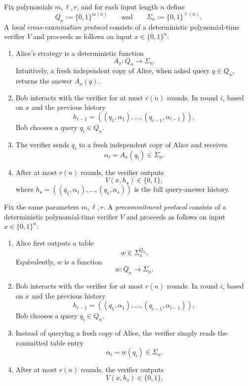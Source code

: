\documentclass[11pt]{article}
\begin{document}
\begin{definition}
Fix polynomials \(m,\ell,r\), and for each input length \(n\) define
\[
Q_n := \{0,1\}^{m(n)}
\qquad\text{and}\qquad
\Sigma_n := \{0,1\}^{\ell(n)}.
\]
A \emph{local cross-examination protocol} consists of a deterministic polynomial-time
verifier \(V\) and proceeds as follows on input \(x\in\{0,1\}^n\):

\begin{enumerate}
    \item Alice's strategy is a deterministic function
    \[
    A_x : Q_n \to \Sigma_n.
    \]
    Intuitively, a fresh independent copy of Alice, when asked query \(q\in Q_n\),
    returns the answer \(A_x(q)\).

    \item Bob interacts with the verifier for at most \(r(n)\) rounds.
    In round \(i\), based on \(x\) and the previous history
    \[
    h_{i-1} = ((q_1,\alpha_1),\dots,(q_{i-1},\alpha_{i-1})),
    \]
    Bob chooses a query \(q_i \in Q_n\).

    \item The verifier sends \(q_i\) to a fresh independent copy of Alice and receives
    \[
    \alpha_i = A_x(q_i)\in\Sigma_n.
    \]

    \item After at most \(r(n)\) rounds, the verifier outputs
    \[
    V(x,h_s)\in\{0,1\},
    \]
    where \(h_s=((q_1,\alpha_1),\dots,(q_s,\alpha_s))\) is the full query-answer history.
\end{enumerate}
\end{definition}

\begin{definition}
Fix the same parameters \(m,\ell,r\).
A \emph{precommitment protocol} consists of a deterministic polynomial-time verifier
\(V\) and proceeds as follows on input \(x\in\{0,1\}^n\):

\begin{enumerate}
    \item Alice first outputs a table
    \[
    w \in \Sigma_n^{Q_n}.
    \]
    Equivalently, \(w\) is a function
    \[
    w : Q_n \to \Sigma_n.
    \]

    \item Bob interacts with the verifier for at most \(r(n)\) rounds.
    In round \(i\), based on \(x\) and the previous history
    \[
    h_{i-1} = ((q_1,\alpha_1),\dots,(q_{i-1},\alpha_{i-1})),
    \]
    Bob chooses a query \(q_i\in Q_n\).

    \item Instead of querying a fresh copy of Alice, the verifier simply reads the
    committed table entry
    \[
    \alpha_i = w(q_i)\in \Sigma_n.
    \]

    \item After at most \(r(n)\) rounds, the verifier outputs
    \[
    V(x,h_s)\in\{0,1\}.
    \]
\end{enumerate}
\end{definition}
\end{document}

